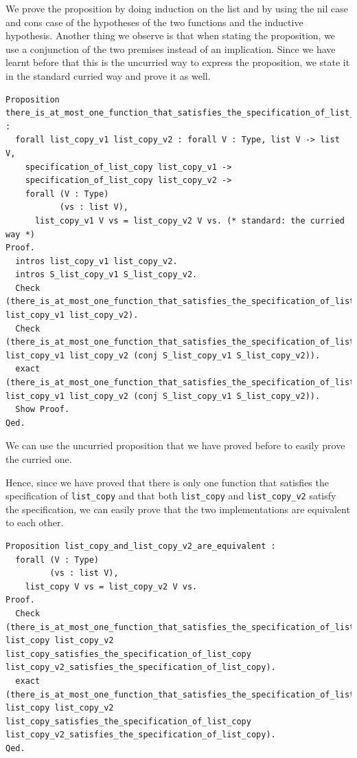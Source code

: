\documentclass{article}
\begin{document}
We prove the proposition by doing induction on the list and by using the nil case and cons case of the hypotheses of the two functions and the inductive hypothesis. Another thing we observe is that when stating the proposition, we use a conjunction of the two premises instead of an implication. Since we have learnt before that this is the uncurried way to express the proposition, we state it in the standard curried way and prove it as well.

\begin{lstlisting}
Proposition there_is_at_most_one_function_that_satisfies_the_specification_of_list_copy' :
  forall list_copy_v1 list_copy_v2 : forall V : Type, list V -> list V,
    specification_of_list_copy list_copy_v1 ->
    specification_of_list_copy list_copy_v2 ->
    forall (V : Type)
           (vs : list V),     
      list_copy_v1 V vs = list_copy_v2 V vs. (* standard: the curried way *)
Proof.
  intros list_copy_v1 list_copy_v2.
  intros S_list_copy_v1 S_list_copy_v2.
  Check (there_is_at_most_one_function_that_satisfies_the_specification_of_list_copy list_copy_v1 list_copy_v2).
  Check (there_is_at_most_one_function_that_satisfies_the_specification_of_list_copy list_copy_v1 list_copy_v2 (conj S_list_copy_v1 S_list_copy_v2)).
  exact (there_is_at_most_one_function_that_satisfies_the_specification_of_list_copy list_copy_v1 list_copy_v2 (conj S_list_copy_v1 S_list_copy_v2)).
  Show Proof.
Qed.
\end{lstlisting}


We can use the uncurried proposition that we have proved before to easily prove the curried one. 

Hence, since we have proved that there is only one function that satisfies the specification of \texttt{list\_copy} and that both \texttt{list\_copy} and \texttt{list\_copy\_v2} satisfy the specification, we can easily prove that the two implementations are equivalent to each other.

\begin{lstlisting}
Proposition list_copy_and_list_copy_v2_are_equivalent :
  forall (V : Type)
         (vs : list V),
    list_copy V vs = list_copy_v2 V vs.
Proof.
  Check (there_is_at_most_one_function_that_satisfies_the_specification_of_list_copy' list_copy list_copy_v2 list_copy_satisfies_the_specification_of_list_copy list_copy_v2_satisfies_the_specification_of_list_copy).
  exact (there_is_at_most_one_function_that_satisfies_the_specification_of_list_copy' list_copy list_copy_v2 list_copy_satisfies_the_specification_of_list_copy list_copy_v2_satisfies_the_specification_of_list_copy).
Qed.
\end{lstlisting}
\end{document}
